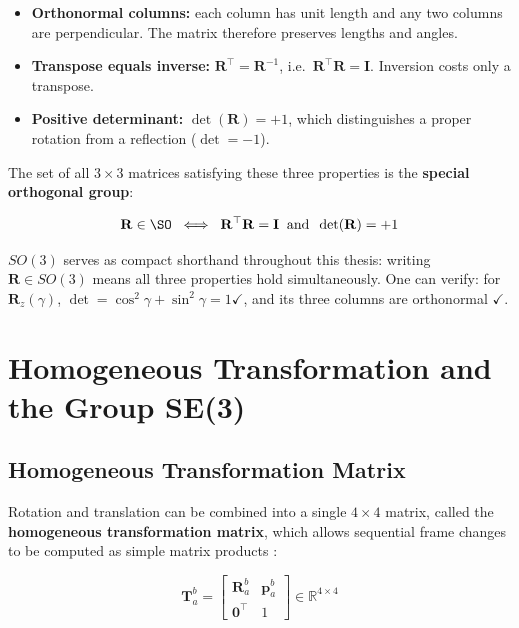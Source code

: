 \begin{itemize}
  \item \textbf{Orthonormal columns:} each column has unit length and
        any two columns are perpendicular.
        The matrix therefore preserves lengths and angles.
  \item \textbf{Transpose equals inverse:}
        $\mathbf{R}^\top = \mathbf{R}^{-1}$, i.e.\
        $\mathbf{R}^\top\mathbf{R} = \mathbf{I}$.
        Inversion costs only a transpose.
  \item \textbf{Positive determinant:} $\det(\mathbf{R}) = +1$,
        which distinguishes a proper rotation from a reflection
        ($\det=-1$).
\end{itemize}

The set of all $3\times3$ matrices satisfying these three properties is
the \textbf{special orthogonal group}:

\begin{equation}
\label{eq:rot}
\mathbf{R} \in \SO
\;\;\Longleftrightarrow\;\;
\mathbf{R}^\top\mathbf{R} = \mathbf{I}
\;\;\text{and}\;\;
\det(\mathbf{R}) = +1
\end{equation}

$SO(3)$ serves as compact shorthand throughout this thesis:
writing $\mathbf{R}\in SO(3)$ means all three properties hold
simultaneously.
One can verify: for $\mathbf{R}_z(\gamma)$, $\det = \cos^2\gamma +
\sin^2\gamma = 1\checkmark$, and its three columns are orthonormal
$\checkmark$.

\section{Homogeneous Transformation and the Group SE(3)}
\label{sec:homogeneous}

\subsection{Homogeneous Transformation Matrix}

Rotation and translation can be combined into a single $4\times4$
matrix, called the \textbf{homogeneous transformation matrix}, which
allows sequential frame changes to be computed as simple matrix
products \cite{Hartley2003, Craig2005}:

\begin{equation}
\label{eq:homogeneous}
\mathbf{T}_{a}^{b} =
\begin{bmatrix}
\mathbf{R}_{a}^{b} & \mathbf{p}_{a}^{b} \\[3pt]
\mathbf{0}^\top    & 1
\end{bmatrix}
\in \mathbb{R}^{4\times4}
\end{equation}

